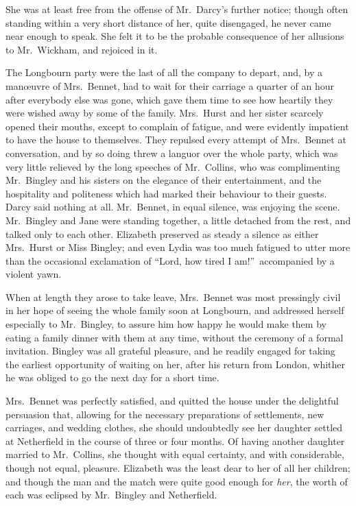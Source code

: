 \documentclass[12pt,english]{book}
\begin{document}
She was at least free from the offense of Mr.\ Darcy's further notice;
though often standing within a very short distance of her, quite disengaged,
he never came near enough to speak. She felt it to be the probable
consequence of her allusions to Mr.\ Wickham, and rejoiced in it.

The Longbourn party were the last of all the company to depart, and,
by a man\oe{}uvre of Mrs.\ Bennet, had to wait for their carriage
a quarter of an hour after everybody else was gone, which gave them
time to see how heartily they were wished away by some of the family.
Mrs.\ Hurst and her sister scarcely opened their mouths, except to
complain of fatigue, and were evidently impatient to have the house
to themselves. They repulsed every attempt of Mrs.\ Bennet at conversation,
and by so doing threw a languor over the whole party, which was very
little relieved by the long speeches of Mr.\ Collins, who was complimenting
Mr.\ Bingley and his sisters on the elegance of their entertainment,
and the hospitality and politeness which had marked their behaviour
to their guests. Darcy said nothing at all. Mr.\ Bennet, in equal
silence, was enjoying the scene. Mr.\ Bingley and Jane were standing
together, a little detached from the rest, and talked only to each
other. Elizabeth preserved as steady a silence as either Mrs.\ Hurst
or Miss Bingley; and even Lydia was too much fatigued to utter more
than the occasional exclamation of {}``Lord, how tired I am!''\ accompanied
by a violent yawn.

When at length they arose to take leave, Mrs.\ Bennet was most pressingly
civil in her hope of seeing the whole family soon at Longbourn, and
addressed herself especially to Mr.\ Bingley, to assure him how happy
he would make them by eating a family dinner with them at any time,
without the ceremony of a formal invitation. Bingley was all grateful
pleasure, and he readily engaged for taking the earliest opportunity
of waiting on her, after his return from London, whither he was obliged
to go the next day for a short time.

Mrs.\ Bennet was perfectly satisfied, and quitted the house under
the delightful persuasion that, allowing for the necessary preparations
of settlements, new carriages, and wedding clothes, she should undoubtedly
see her daughter settled at Netherfield in the course of three or
four months. Of having another daughter married to Mr.\ Collins,
she thought with equal certainty, and with considerable, though not
equal, pleasure. Elizabeth was the least dear to her of all her children;
and though the man and the match were quite good enough for \textit{her},
the worth of each was eclipsed by Mr.\ Bingley and Netherfield.
\end{document}
